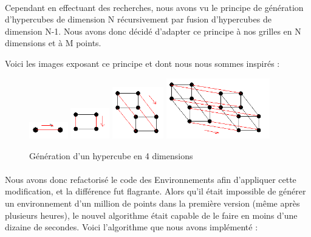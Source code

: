 \documentclass[pidr]{tnreport}
\begin{document}
\paragraph{}
Cependant en effectuant des recherches, nous avons vu le principe de génération d'hypercubes de dimension N récursivement par fusion d'hypercubes de dimension N-1. Nous avons donc décidé d'adapter ce principe à nos grilles en N dimensions et à M points.

Voici les images exposant ce principe et dont nous nous sommes inspirés : 

\begin{figure}[H]
    \includegraphics[width=0.15\textwidth]{./figures/Hypercube-dim1.PNG}
    \includegraphics[width=0.15\textwidth]{./figures/Hypercube-dim2.PNG}
    \includegraphics[width=0.2\textwidth]{./figures/Hypercube-dim3.PNG}
    \includegraphics[width=0.4\textwidth]{./figures/Hypercube-dim4.PNG}
    \caption{Génération d'un hypercube en 4 dimensions}
\end{figure}

\paragraph{}
Nous avons donc refactorisé le code des Environnements afin d'appliquer cette modification, et la différence fut flagrante. Alors qu'il était impossible de générer un environnement d'un million de points dans la première version (même après plusieurs heures), le nouvel algorithme était capable de le faire en moins d'une dizaine de secondes. \linebreak
Voici l'algorithme que nous avons implémenté : 
\end{document}
